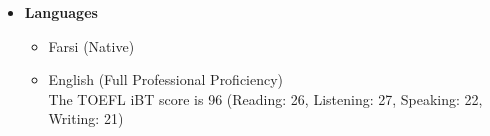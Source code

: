 \documentclass[12pt]{article}
\begin{document}
\begin{itemize}
\begin{itemize}
\begin{multicols}{3}
\begin{itemize}
				\item Optimal Control
				\item Automatic Control
				\item Robust Control
			\end{itemize}
		\end{multicols}
		\item Game Theory
		\begin{multicols}{2}
			\begin{itemize}
				\item Differential Game
				\item Multi-Agent Systems
				\item Cooperative Game
				\item Non-Cooperative Game
			\end{itemize}
		\end{multicols}
	\end{itemize}
	
	\item \textbf{Languages}
	\begin{itemize}
		\item Farsi (Native)
		\item English (Full Professional Proficiency) %
		\vspace{1pt} \\ 
		The TOEFL iBT score is 96 (Reading: 26, Listening: 27, Speaking: 22, Writing: 21)  
	\end{itemize}
\end{itemize}
\end{document}
